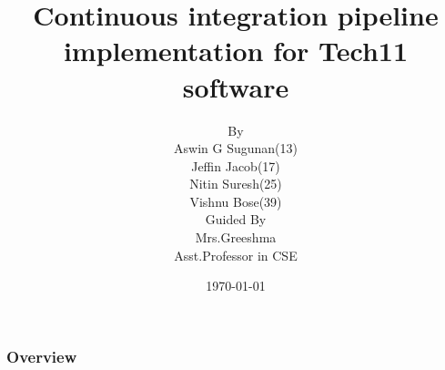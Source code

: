 \documentclass{beamer}
\title[] { Continuous integration pipeline implementation for Tech11 software
}
\author[]{By\\ Aswin G Sugunan(13)\\Jeffin Jacob(17)\\Nitin Suresh(25)\\Vishnu Bose(39)\\Guided By\\Mrs.Greeshma\\Asst.Professor in CSE}
\institute[CE CHERTHALA]{COLLEGE OF ENGINEERING CHERTHALA}
\date{\today}
\begin{document}
\begin{frame}
\titlepage %
\end{frame}

\begin{frame}
\frametitle{Overview} %
\tableofcontents %
\end{frame}




%
 

 
\end{document}
